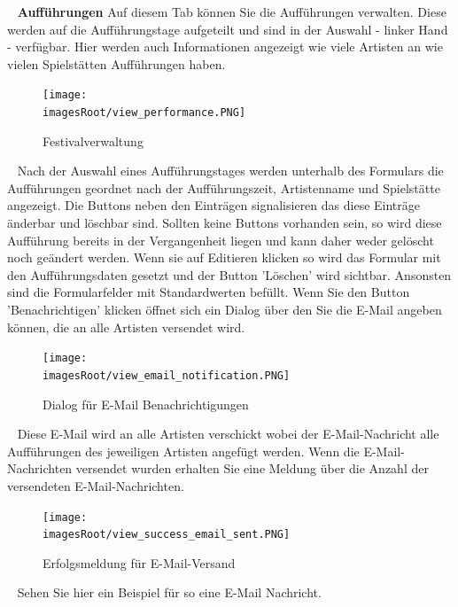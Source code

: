 \documentclass[11pt, a4paper, twoside]{article}   	%
\newcommand{\imagesRoot}{images}
\begin{document}
\ \newline
\newpage
\textbf{Aufführungen}
Auf diesem Tab können Sie die Aufführungen verwalten. Diese werden auf die Aufführungstage aufgeteilt und sind in der Auswahl - linker Hand - verfügbar. Hier werden auch Informationen angezeigt wie viele Artisten an wie vielen Spielstätten Aufführungen haben.
	\begin{figure}[h]
	\centering
	\texttt{[image: \\imagesRoot/view\_performance.PNG]}
	\caption
	{Festivalverwaltung}
\end{figure}
\ \newline
Nach der Auswahl eines Aufführungstages werden unterhalb des Formulars die Aufführungen geordnet nach der Aufführungszeit, Artistenname und Spielstätte angezeigt. Die Buttons neben den Einträgen signalisieren das diese Einträge änderbar und löschbar sind. Sollten keine Buttons vorhanden sein, so wird diese Aufführung bereits in der Vergangenheit liegen und kann daher weder gelöscht noch geändert werden.
\newline
\newline
Wenn sie auf Editieren klicken so wird das Formular mit den Aufführungsdaten gesetzt und der Button 'Löschen' wird sichtbar. Ansonsten sind die Formularfelder mit Standardwerten befüllt.
\newline
\newline
Wenn Sie den Button 'Benachrichtigen' klicken öffnet sich ein Dialog über den Sie die E-Mail angeben können, die an alle Artisten versendet wird.
	\begin{figure}[h]
	\centering
	\texttt{[image: \\imagesRoot/view\_email\_notification.PNG]}
	\caption
	{Dialog für E-Mail Benachrichtigungen}
\end{figure}
\ \newline
Diese E-Mail wird an alle Artisten verschickt wobei der E-Mail-Nachricht alle Aufführungen des jeweiligen Artisten angefügt werden.
\newpage
Wenn die E-Mail-Nachrichten versendet wurden erhalten Sie eine Meldung über die Anzahl der versendeten E-Mail-Nachrichten.
	\begin{figure}[h]
	\centering
	\texttt{[image: \\imagesRoot/view\_success\_email\_sent.PNG]}
	\caption
	{Erfolgsmeldung für E-Mail-Versand}
\end{figure}
\ \newline
Sehen Sie hier ein Beispiel für so eine E-Mail Nachricht.
\newline
\end{document}
